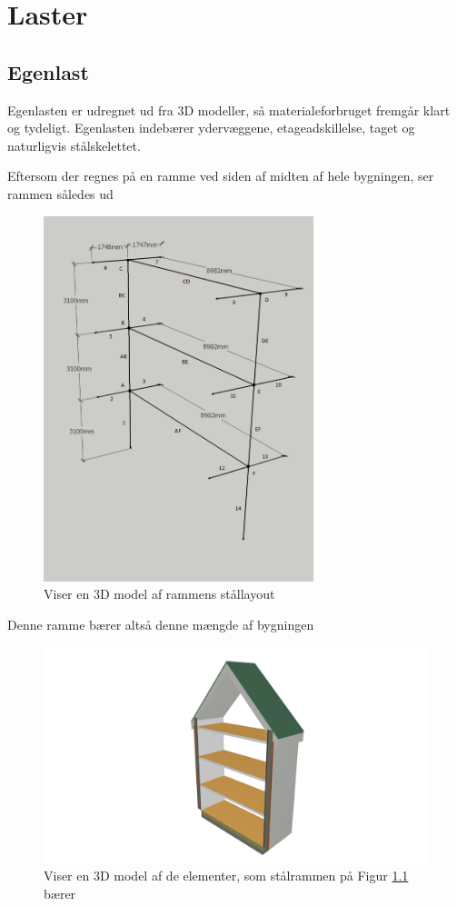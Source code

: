 \chapter{Laster}
\section{Egenlast}
	Egenlasten er udregnet ud fra 3D modeller, så materialeforbruget fremgår klart og tydeligt. Egenlasten indebærer ydervæggene, etageadskillelse, taget og naturligvis stålskelettet.
	
	Eftersom der regnes på en ramme ved siden af midten af hele bygningen, ser rammen således ud
\begin{figure}[H] 
	\centering
	\includegraphics[width=0.7\textwidth]{billeder/Staaldimensioner_5}
	\caption{Viser en 3D model af rammens stållayout }
	\label{fig:EL1}
\end{figure}	
	
	Denne ramme bærer altså denne mængde af bygningen
\begin{figure}[H] 
	\centering
	\includegraphics[width=1\textwidth]{billeder/Tvaersnit1}
	\caption{Viser en 3D model af de elementer, som stålrammen på Figur \ref{fig:EL1} bærer}
	\label{fig:EL2}
\end{figure}

